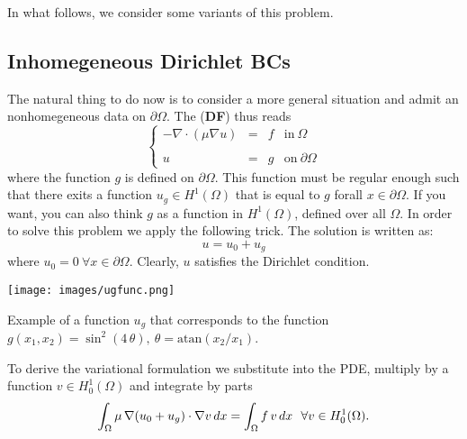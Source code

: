 In what follows, we consider some variants of this problem.

\subsection{Inhomegeneous Dirichlet BCs}

The natural thing to do now is to consider a more general situation
and admit an nonhomegeneous data on $\partial{\Omega}$.
The (\textbf{DF}) thus reads
\begin{equation}
\left \{
\begin{array}{rcll}
-\nabla \cdot \left ( \mu \nabla{u} \right) & = & f & \mbox{in}~\Omega \\
& & & \\
u & = & g & \mbox{on}~\partial{\Omega}
\end{array}
\right.
\end{equation}
where the function $g$ is defined on $\partial{\Omega}$.
This function must be regular enough such that there
exits a function $u_g\in H^1(\Omega)$ that is equal
to $g$ forall $x \in \partial{\Omega}$. If you want,
you can also think $g$ as a function in $H^1(\Omega)$,
defined over all $\Omega$. In order to solve this problem we
apply the following trick. The solution is written as:
\begin{equation}
u = u_0 + u_g
\end{equation}
where $u_0 = 0~\forall x\in \partial{\Omega}$. Clearly,
$u$ satisfies the Dirichlet condition.
\begin{marginfigure}[2.5cm]
	\texttt{[image: images/ugfunc.png]}
	\caption[]{Example of a function $u_g$ that corresponds to the function
        $g(x_1,x_2) = \sin^2(4\,\theta),~\theta=\mbox{atan}(x_2/x_1)$.}
\end{marginfigure}
To derive the variational
formulation we substitute into the PDE, multiply by a function
$v \in H^1_0(\Omega)$ and integrate by parts
\begin{equation}
\int_{\Omega}{\mu\,\nabla{(u_0 + u_g)}\cdot \nabla{v}}\,dx =
        \int_{\Omega}{f\,v}\,dx ~~ \forall v \in H^1_0(\Omega). \labeq{poissonbasicinhg}
\end{equation}
